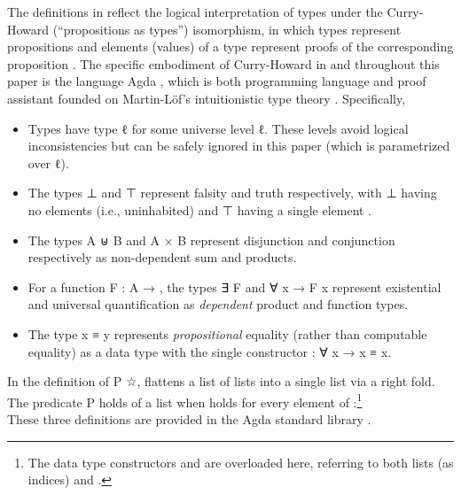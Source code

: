 \documentclass[acmsmall,screen,timestamp,anonymous,review]{acmart}
\begin{document}
The definitions in  reflect the logical interpretation of types under the Curry-Howard (``propositions as types'') isomorphism, in which types represent propositions and elements (values) of a type represent proofs of the corresponding proposition \citep{Wadler2015propositions}.
The specific embodiment of Curry-Howard in  and throughout this paper is the language Agda \citep{Norell2008AFP, BoveEtAl2009Agda}, which is both programming language and proof assistant founded on Martin-Löf's intuitionistic type theory \citep{MartinLöf1984intuitionistic}.
Specifically,
\begin{itemize}

\item Types have type { \AB ℓ} for some universe level \AB ℓ.
These levels avoid logical inconsistencies but can be safely ignored in this paper (which is parametrized over \AB ℓ).

\item The types \AD ⊥ and \ARe ⊤ represent falsity and truth respectively, with \AD ⊥ having no elements (i.e., uninhabited) and \ARe ⊤ having a single element .

\item The types {\AB A \AD ⊎ \AB B} and {\AB A \ARe × \AB B} represent disjunction and conjunction respectively as non-dependent sum and products.

\item For a function {\AB F \AS : \AB A \AS →  }, the types {\AF ∃ \AB F}  and {\AF ∀ \AB x \AS → \AB F \AB x} represent existential and universal quantification as \emph{dependent} product and function types.

\item The type {\AB x \AD ≡ \AB y} represents \emph{propositional} equality (rather than computable equality) as a data type with the single constructor { \AS : \AS ∀ \AB x \AS → \AB x \AD ≡ \AB x}.

\end{itemize}

In the definition of {\AB P \AF ☆},  flattens a list of lists into a single list via a right fold.
The predicate { \AB P} holds of a list  when  holds for every element of :\footnote{The data type constructors \AIC{[]} and  are overloaded here, referring to both lists (as indices) and .}\\
\vspace{-1ex}
These three definitions are provided in the Agda standard library \citep{agda-stdlib}.
\end{document}
